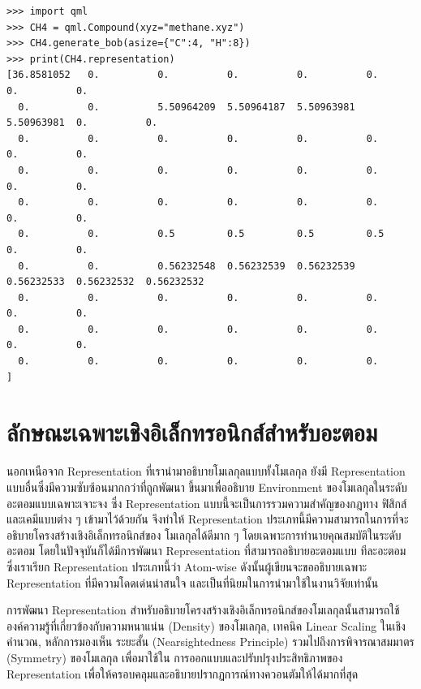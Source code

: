 \begin{lstlisting}[style=MyPython]
>>> import qml
>>> CH4 = qml.Compound(xyz="methane.xyz")
>>> CH4.generate_bob(asize={"C":4, "H":8})
>>> print(CH4.representation)
[36.8581052   0.          0.          0.          0.          0.          0.          0.
  0.          0.          5.50964209  5.50964187  5.50963981  5.50963981  0.          0.
  0.          0.          0.          0.          0.          0.          0.          0.
  0.          0.          0.          0.          0.          0.          0.          0.
  0.          0.          0.          0.          0.          0.          0.          0.
  0.          0.          0.5         0.5         0.5         0.5         0.          0.
  0.          0.          0.56232548  0.56232539  0.56232539  0.56232533  0.56232532  0.56232532
  0.          0.          0.          0.          0.          0.          0.          0.
  0.          0.          0.          0.          0.          0.          0.          0.
  0.          0.          0.          0.          0.          0.        ]
\end{lstlisting}

\section{ลักษณะเฉพาะเชิงอิเล็กทรอนิกส์สำหรับอะตอม}
\label{sec:elec_feat}

นอกเหนือจาก Representation ที่เรานำมาอธิบายโมเลกุลแบบทั้งโมเลกุล ยังมี Representation แบบอื่นซึ่งมีความซับซ้อนมากกว่าที่ถูกพัฒนา%
ขึ้นมาเพื่ออธิบาย Environment ของโมเลกุลในระดับอะตอมแบบเฉพาะเจาะจง ซึ่ง Representation แบบนี้จะเป็นการรวมความสำคัญของกฎทาง%
ฟิสิกส์และเคมีแบบต่าง ๆ เข้ามาไว้ด้วยกัน จึงทำให้ Representation ประเภทนี้มีความสามารถในการที่จะอธิบายโครงสร้างเชิงอิเล็กทรอนิกส์ของ%
โมเลกุลได้ดีมาก ๆ โดยเฉพาะการทำนายคุณสมบัติในระดับอะตอม โดยในปัจจุบันก็ได้มีการพัฒนา Representation ที่สามารถอธิบายอะตอมแบบ%
ทีละอะตอม ซึ่งเราเรียก Representation ประเภทนี้ว่า Atom-wise ดังนั้นผู้เขียนจะขออธิบายเฉพาะ Representation ที่มีความโดดเด่นน่าสนใจ%
และเป็นที่นิยมในการนำมาใช้ในงานวิจัยเท่านั้น

การพัฒนา Representation สำหรับอธิบายโครงสร้างเชิงอิเล็กทรอนิกส์ของโมเลกุลนั้นสามารถใช้องค์ความรู้ที่เกี่ยวข้องกับความหนาแน่น (Density)
ของโมเลกุล\autocite{yang1991}, เทคนิค Linear Scaling ในเชิงคำนวณ\autocite{galli1992,goedecker1999}, หลักการมองเห็น%
ระยะสั้น (Nearsightedness Principle)\autocite{prodan2005} รวมไปถึงการพิจารณาสมมาตร (Symmetry) ของโมเลกุล เพื่อมาใช้ใน%
การออกแบบและปรับปรุงประสิทธิภาพของ Representation เพื่อให้ครอบคลุมและอธิบายปรากฏการณ์ทางควอนตัมให้ได้มากที่สุด%
\autocite{ceriotti2018}

